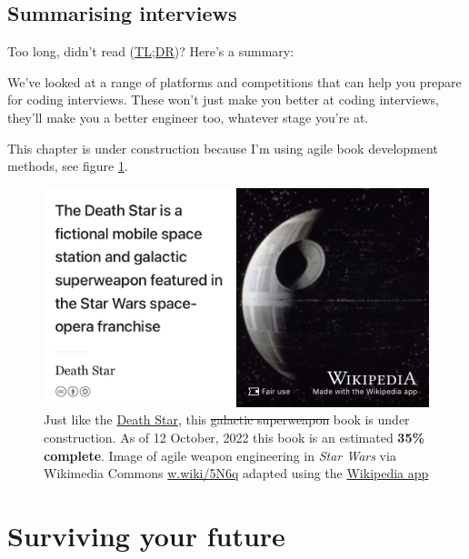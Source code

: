 \documentclass[
]{book}
\begin{document}
\hypertarget{tldr9}{%
\section{Summarising interviews}\label{tldr9}}

Too long, didn't read (\href{https://en.wiktionary.org/wiki/too_long;_didn\%27t_read}{TL;DR})? Here's a summary:

We've looked at a range of platforms and competitions that can help you prepare for coding interviews. These won't just make you better at coding interviews, they'll make you a better engineer too, whatever stage you're at.

This chapter is under construction because I'm using agile book development methods, see figure \ref{fig:deathstar6-fig}.

\begin{figure}

{\centering \includegraphics[width=0.99\linewidth]{images/DeathStar2} 

}

\caption{Just like the \href{https://en.wikipedia.org/wiki/Death_Star}{Death Star}, this \sout{galactic superweapon} book is under construction. As of 12 October, 2022 this book is an estimated \textbf{35\% complete}. Image of agile weapon engineering in \emph{Star Wars} via Wikimedia Commons \href{https://w.wiki/5N6q}{w.wiki/5N6q} adapted using the \href{https://apps.apple.com/gb/app/wikipedia/id324715238}{Wikipedia app}}\label{fig:deathstar6-fig}
\end{figure}

\hypertarget{surviving}{%
\chapter{Surviving your future}\label{surviving}}
\end{document}
